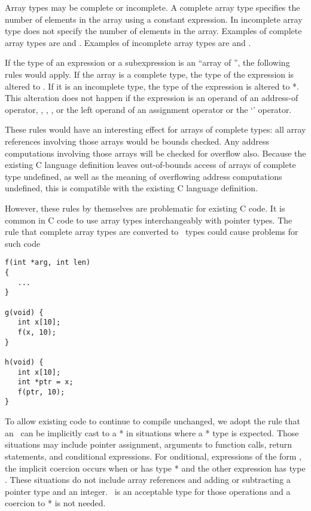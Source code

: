 Array types may be complete or incomplete. A complete array type
specifies the number of elements in the array using a constant
expression. In incomplete array type does not specify the number of
elements in the array. Examples of complete array types are 
and . Examples of incomplete array types are
 and .

If the type of an expression or a subexpression is an ``array of
'', the following rules would apply. If the array is a complete
type, the type of the expression is altered to
\arrayptrT. If it is
an incomplete type, the type of the expression is altered to  *.
This alteration does not happen if the expression is an operand of an
address-of operator, \code{++}, \code{--}, , or the
left operand of an assignment operator or the `' operator.

These rules would have an interesting effect for arrays of complete
types: all array references involving those arrays would be bounds
checked. Any address computations involving those arrays will be checked
for overflow also. Because the existing C language definition leaves
out-of-bounds access of arrays of complete type undefined, as well as
the meaning of overflowing address computations undefined, this is
compatible with the existing C language definition.

However, these rules by themselves are problematic for existing C code.
It is common in C code to use array types interchangeably with pointer
types. The rule that complete array types are converted to
\arrayptr\ types could cause problems for such code

\begin{lstlisting}
f(int *arg, int len)
{ 
   ...
}

g(void) {
   int x[10];
   f(x, 10);
}

h(void) {
   int x[10];
   int *ptr = x;
   f(ptr, 10);
}
\end{lstlisting}

To allow existing code to continue to compile unchanged, we adopt the
rule that an \arrayptrT\ can be
implicitly cast to a  * in situations where a  * type is
expected. Those situations may include pointer assignment, arguments to
function calls, return statements, and conditional expressions. For
onditional, expressions of the form    \code{:}
, the implicit coercion occurs when  or  has type  * and
the other expression has type
\arrayptrT. These situations do not
include array references and adding or subtracting a pointer type and an
integer. \arrayptrT\ is an acceptable
type for those operations and a coercion to  * is not needed.

